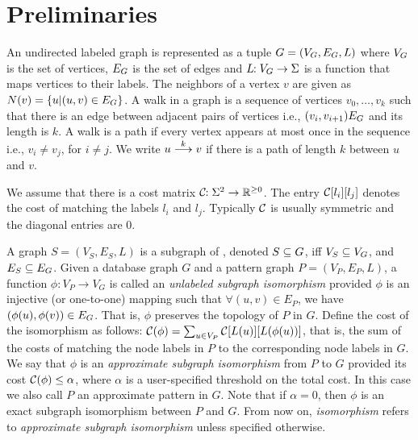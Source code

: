 \section{Preliminaries}

An undirected labeled graph \db is represented as a tuple $ \db =
(\vg,\eg,L) $ where $\vg$ is the set of vertices, $\eg$ is the set of
edges and $L\!\!: \vg \rightarrow \Sigma $ is a function that maps
vertices to their labels.  The neighbors of a vertex $v$ are given as $
N(v) = \{ u | (u,v) \in \eg \} $.  A walk in a graph is a sequence of
vertices $v_0,\ldots,v_k$ such that there is an edge between 
adjacent pairs of vertices i.e., $(v_i, v_{i+1}) \eg$ and its length
is $k$. A walk is a path if every vertex appears at most once in the
sequence i.e., $v_i \neq v_j$, for $i \neq j$.
We write $\kpath{u}{v}{k}$ if there is a path of length 
$k$ between $u$ and $v$.

\smallskip{} We assume that there is a cost
matrix $\cC\!\!:\Sigma^{2} \rightarrow \mathbb{R}^{\geq 0} $.  The entry
$\matij{\cC}{l_i}{l_j}$ denotes the cost of matching the labels $l_i$
and $l_j$. Typically $\cC$ is
usually symmetric and the diagonal entries are $0$.

\smallskip{} A graph $S =
(V_S,E_S,L)$ is a subgraph of \db, denoted $S \subseteq \db$, iff $V_S
\subseteq \vg$, and $E_S \subseteq \eg$.  Given a database graph $G$ and
a pattern graph $P = (V_P,E_P,L)$, a function $\phi\!\!: V_P \to V_G$ is
called an {\em unlabeled subgraph isomorphism} provided $\phi$ is an
injective (or one-to-one) mapping such that $\forall (u,v) \in E_P$, we
have $(\phi(u),\phi(v)) \in \eg$. That is, $\phi$ preserves the topology
of $P$ in $G$. Define the cost of the isomorphism as follows: $\cC(\phi)
= \sum_{u \in \vp} \matij{\cC}{L(u)}{L(\phi(u))}$, that is, the sum of
the costs of matching the node labels in $P$ to the corresponding node
labels in $G$.  We say that $\phi$ is an {\em approximate subgraph
isomorphism} from $P$ to $G$ provided its cost $\cC(\phi) \le \alpha$,
where $\alpha$ is a user-specified threshold on the total cost. In this
case we also call $P$ an approximate pattern in $G$. Note that if
$\alpha = 0$, then $\phi$ is an exact subgraph isomorphism between $P$
and $G$. From now on, \textit{isomorphism} refers to \textit{approximate
subgraph isomorphism} unless specified otherwise.


